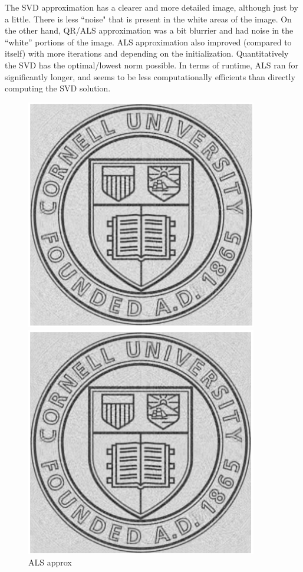 \documentclass[11pt,onecolumn]{article}
\begin{document}
The SVD approximation has a clearer and more detailed image, although just by a little. There is less ``noise" that is present in the white areas of the image. On the other hand, QR/ALS approximation was a bit blurrier and had noise in the ``white'' portions of the image. ALS approximation also improved (compared to itself) with more iterations and depending on the initialization. Quantitatively the SVD has the optimal/lowest norm possible. In terms of runtime, ALS ran for significantly longer, and seems to be less computationally efficients than directly computing the SVD solution.


\begin{figure}[H]
  \centering
  \begin{minipage}{0.45\textwidth}
    \centering
    \includegraphics[width=0.9\textwidth]{./images/ALS.png}
    \caption{ALS approx}
  \end{minipage}\hfill
  \begin{minipage}{0.45\textwidth}
    \centering
    \includegraphics[width=0.9\textwidth]{./images/SVD.png}

\end{minipage}
\end{figure}
\end{document}
